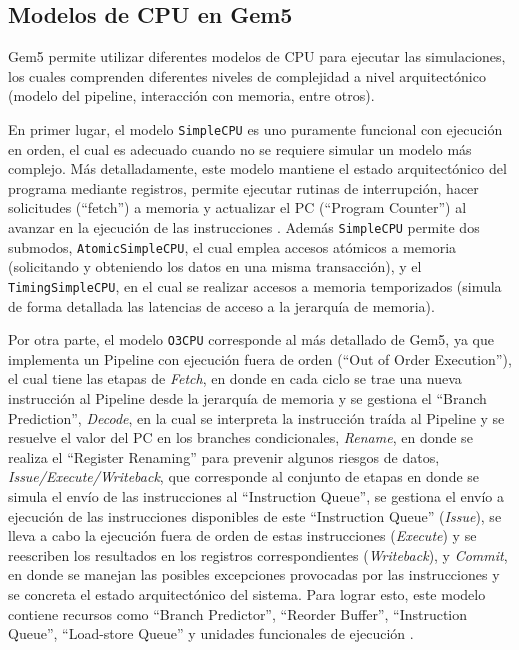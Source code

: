 \documentclass {article}
\begin{document}
\subsection{Modelos de CPU en Gem5}
Gem5 permite utilizar diferentes modelos de CPU para ejecutar las simulaciones, los cuales
comprenden diferentes niveles de complejidad a nivel arquitectónico (modelo del pipeline,
interacción con memoria, entre otros).

En primer lugar, el modelo \texttt{SimpleCPU} es uno puramente funcional con ejecución en orden, el
cual es adecuado cuando no se requiere simular un modelo más complejo. Más detalladamente, este
modelo mantiene el estado arquitectónico del programa mediante registros, permite ejecutar rutinas
de interrupción, hacer solicitudes (``fetch'') a memoria y actualizar el PC (``Program Counter'') al
avanzar en la ejecución de las instrucciones \cite{***}. Además \texttt{SimpleCPU} permite dos
submodos, \texttt{AtomicSimpleCPU}, el cual emplea accesos atómicos a memoria (solicitando y
obteniendo los datos en una misma transacción), y el \texttt{TimingSimpleCPU}, en el cual se
realizar accesos a memoria temporizados (simula de forma detallada las latencias de acceso a la
jerarquía de memoria).

Por otra parte, el modelo \texttt{O3CPU} corresponde al más detallado de Gem5, ya que implementa un
Pipeline con ejecución fuera de orden (``Out of Order Execution''), el cual tiene las etapas de
\textit{Fetch}, en donde en cada ciclo se trae una nueva instrucción al Pipeline desde la jerarquía
de memoria y se gestiona el ``Branch Prediction'', \textit{Decode}, en la cual se interpreta la
instrucción traída al Pipeline y se resuelve el valor del PC en los branches condicionales,
\textit{Rename}, en donde se realiza el ``Register Renaming'' para prevenir algunos riesgos de
datos, \textit{Issue/Execute/Writeback}, que corresponde al conjunto de etapas en donde se simula el
envío de las instrucciones al ``Instruction Queue'', se gestiona el envío a ejecución de las
instrucciones disponibles de este ``Instruction Queue'' (\textit{Issue}), se lleva a cabo la
ejecución fuera de orden de estas instrucciones (\textit{Execute}) y se reescriben los resultados en
los registros correspondientes (\textit{Writeback}), y \textit{Commit}, en donde se manejan las
posibles excepciones provocadas por las instrucciones y se concreta el estado arquitectónico del
sistema. Para lograr esto, este modelo contiene recursos como ``Branch Predictor'', ``Reorder
Buffer'', ``Instruction Queue'', ``Load-store Queue'' y unidades funcionales de ejecución
\cite{***}.
\end{document}
